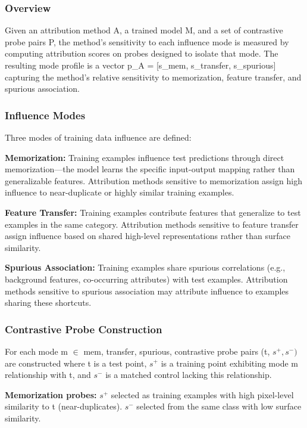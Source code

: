
\subsubsection{Overview}

Given an attribution method A, a trained model M, and a set of contrastive probe pairs P, the method's sensitivity to each influence mode is measured by computing attribution scores on probes designed to isolate that mode. The resulting mode profile is a vector p\_A = [s\_mem, s\_transfer, s\_spurious] capturing the method's relative sensitivity to memorization, feature transfer, and spurious association.

\subsubsection{Influence Modes}

Three modes of training data influence are defined:

\textbf{Memorization:} Training examples influence test predictions through direct memorization---the model learns the specific input-output mapping rather than generalizable features. Attribution methods sensitive to memorization assign high influence to near-duplicate or highly similar training examples.

\textbf{Feature Transfer:} Training examples contribute features that generalize to test examples in the same category. Attribution methods sensitive to feature transfer assign influence based on shared high-level representations rather than surface similarity.

\textbf{Spurious Association:} Training examples share spurious correlations (e.g., background features, co-occurring attributes) with test examples. Attribution methods sensitive to spurious association may attribute influence to examples sharing these shortcuts.

\subsubsection{Contrastive Probe Construction}

For each mode m $\in$ {mem, transfer, spurious}, contrastive probe pairs (t, $s^+, s^-)$ are constructed where t is a test point, $s^+$ is a training point exhibiting mode m relationship with t, and $s^-$ is a matched control lacking this relationship.

\textbf{Memorization probes:} $s^+$ selected as training examples with high pixel-level similarity to t (near-duplicates). $s^-$ selected from the same class with low surface similarity.

